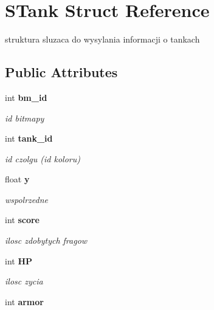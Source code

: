 \section{STank Struct Reference}
\label{struct_s_tank}
struktura sluzaca do wysylania informacji o tankach  


\subsection*{Public Attributes}
\begin{CompactItemize}
\item 
int {\bf bm\_\-id}\label{struct_s_tank_b4d7f6b081473187f6cb0f41612ff068}

\begin{CompactList}\small\item\em id bitmapy \item\end{CompactList}\item 
int {\bf tank\_\-id}\label{struct_s_tank_30d8148e33d4138018d55071f7edd985}

\begin{CompactList}\small\item\em id czolgu (id koloru) \item\end{CompactList}\item 
float {\bf y}\label{struct_s_tank_69ba9d6297e97857e25e49004a59c007}

\begin{CompactList}\small\item\em wspolrzedne \item\end{CompactList}\item 
int {\bf score}\label{struct_s_tank_8201f47124e25d4e0aac5f7350c62ac1}

\begin{CompactList}\small\item\em ilosc zdobytych fragow \item\end{CompactList}\item 
int {\bf HP}\label{struct_s_tank_dbc17baddff7dd031be4157085148d41}

\begin{CompactList}\small\item\em ilosc zycia \item\end{CompactList}\item 
int {\bf armor}\label{struct_s_tank_1faaf413911ccaef783deb9639a39a51}


\end{CompactItemize}
